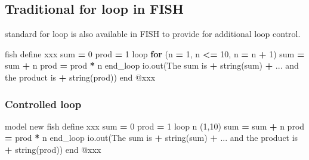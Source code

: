 \documentclass[a4paper, nobind]{templates/ociamthesis}
\newenvironment{Shaded}{\begin{snugshade}}{\end{snugshade}}
\newcommand{\AttributeTok}[1]{\textcolor[rgb]{0.77,0.63,0.00}{#1}}
\newcommand{\BuiltInTok}[1]{#1}
\newcommand{\ControlFlowTok}[1]{\textcolor[rgb]{0.13,0.29,0.53}{\textbf{#1}}}
\newcommand{\DecValTok}[1]{\textcolor[rgb]{0.00,0.00,0.81}{#1}}
\newcommand{\NormalTok}[1]{#1}
\newcommand{\OperatorTok}[1]{\textcolor[rgb]{0.81,0.36,0.00}{\textbf{#1}}}
\newcommand{\StringTok}[1]{\textcolor[rgb]{0.31,0.60,0.02}{#1}}
\renewenvironment{Shaded}
{
  \vspace{10pt}%
  \begin{snugshade}%
}{%
  \end{snugshade}%
  \vspace{8pt}%
}
\begin{document}
\hypertarget{traditional-for-loop-in-fish}{%
\subsection{Traditional for loop in FISH}\label{traditional-for-loop-in-fish}}

standard for loop is also available in FISH to provide for additional
loop control.

\begin{Shaded}
\begin{Highlighting}[]
\NormalTok{fish define xxx}
    \BuiltInTok{sum}  \OperatorTok{=} \DecValTok{0}
\NormalTok{    prod }\OperatorTok{=} \DecValTok{1}
\NormalTok{    loop }\ControlFlowTok{for}\NormalTok{ (n }\OperatorTok{=} \DecValTok{1}\NormalTok{, n }\OperatorTok{\textless{}=} \DecValTok{10}\NormalTok{, n }\OperatorTok{=}\NormalTok{ n }\OperatorTok{+} \DecValTok{1}\NormalTok{)}
        \BuiltInTok{sum}  \OperatorTok{=} \BuiltInTok{sum}  \OperatorTok{+}\NormalTok{ n}
\NormalTok{        prod }\OperatorTok{=}\NormalTok{ prod }\OperatorTok{*}\NormalTok{ n}
\NormalTok{    end\_loop}
\NormalTok{    io.out(}\StringTok{\textquotesingle{}The sum is \textquotesingle{}} \OperatorTok{+}\NormalTok{ string(}\BuiltInTok{sum}\NormalTok{) }\OperatorTok{+}\NormalTok{ ... }
           \StringTok{\textquotesingle{} and the product is \textquotesingle{}} \OperatorTok{+}\NormalTok{ string(prod))}
\NormalTok{end}
\AttributeTok{@xxx}
\end{Highlighting}
\end{Shaded}

\hypertarget{controlled-loop}{%
\subsubsection{Controlled loop}\label{controlled-loop}}

\begin{Shaded}
\begin{Highlighting}[]
\NormalTok{model new}
\NormalTok{fish define xxx}
    \BuiltInTok{sum}  \OperatorTok{=} \DecValTok{0}
\NormalTok{    prod }\OperatorTok{=} \DecValTok{1}
\NormalTok{    loop n (}\DecValTok{1}\NormalTok{,}\DecValTok{10}\NormalTok{)}
        \BuiltInTok{sum}  \OperatorTok{=} \BuiltInTok{sum}  \OperatorTok{+}\NormalTok{ n}
\NormalTok{        prod }\OperatorTok{=}\NormalTok{ prod }\OperatorTok{*}\NormalTok{ n}
\NormalTok{    end\_loop}
\NormalTok{    io.out(}\StringTok{\textquotesingle{}The sum is \textquotesingle{}} \OperatorTok{+}\NormalTok{ string(}\BuiltInTok{sum}\NormalTok{) }\OperatorTok{+}\NormalTok{  ...}
           \StringTok{\textquotesingle{} and the product is \textquotesingle{}} \OperatorTok{+}\NormalTok{ string(prod))}
\NormalTok{end}
\AttributeTok{@xxx}
\end{Highlighting}
\end{Shaded}
\end{document}
